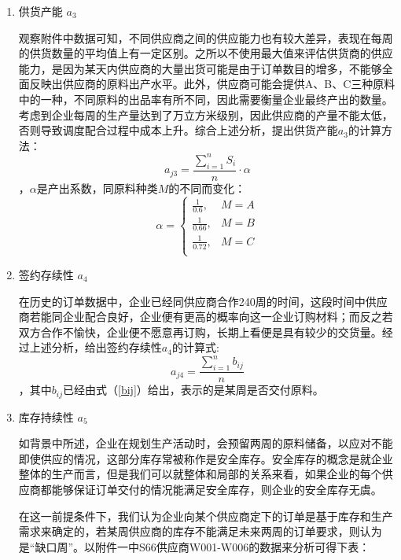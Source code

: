 \documentclass{my_paper}
\begin{document}
\begin{enumerate}
    \item 供货产能 $a_3$
    
    观察附件中数据可知，不同供应商之间的供应能力也有较大差异，表现在每周的供货数量的平均值上有一定区别。之所以不使用最大值来评估供货商的供应能力，是因为某天内供应商的大量出货可能是由于订单数目的增多，不能够全面反映出供应商的原料出产水平。此外，供应商可能会提供A、B、C三种原料中的一种，不同原料的出品率有所不同，因此需要衡量企业最终产出的数量。考虑到企业每周的生产量达到了万立方米级别，因此供应商的产量不能太低，否则导致调度配合过程中成本上升。综合上述分析，提出供货产能$a_3$的计算方法：
    \begin{equation}
    a_{j3}=\frac{\sum\limits^n_{i=1} S_i}{n}\cdot \alpha
    \label{aj3}
    \end{equation}
    ，$\alpha$是产出系数，同原料种类$M$的不同而变化：
    $$\alpha=\begin{cases}
        \frac{1}{0.6} ,& M=A\\
        \frac{1}{0.66} ,& M=B\\
        \frac{1}{0.72} ,& M=C\\
    \end{cases}$$

    \item 签约存续性 $a_4$
    
    在历史的订单数据中，企业已经同供应商合作240周的时间，这段时间中供应商若能同企业配合良好，企业便有更高的概率向这一企业订购材料；而反之若双方合作不愉快，企业便不愿意再订购，长期上看便是具有较少的交货量。经过上述分析，给出签约存续性$a_{4}$的计算式:
    \begin{equation}
    a_{j4}=\frac{\sum\limits^n_{i=1}b_{ij}}{n}
    \label{aj4}
    \end{equation}
    ，其中$b_{ij}$已经由式（\ref{bij}）给出，表示的是某周是否交付原料。

    \item 库存持续性 $a_5$
    
    如背景中所述，企业在规划生产活动时，会预留两周的原料储备，以应对不能即使供应的情况，这部分库存常被称作是安全库存\cite{1}。安全库存的概念是就企业整体的生产而言，但是我们可以就整体和局部的关系来看，如果企业的每个供应商都能够保证订单交付的情况能满足安全库存，则企业的安全库存无虞。
    
    在这一前提条件下，我们认为企业向某个供应商定下的订单是基于库存和生产需求来确定的，若某周供应商的库存不能满足未来两周的订单要求，则认为是“缺口周”。以附件一中S66供应商W001-W006的数据来分析可得下表：
    \begin{table}[ht]


\end{table}
\end{enumerate}
\end{document}
